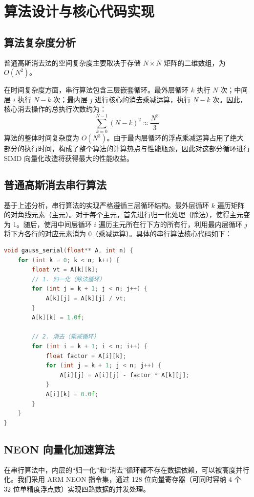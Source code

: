 \documentclass[a4paper]{article}
\begin{document}
\section{算法设计与核心代码实现}

\subsection{算法复杂度分析}
普通高斯消去法的空间复杂度主要取决于存储 $N \times N$ 矩阵的二维数组，为 $O(N^2)$。

在时间复杂度方面，串行算法包含三层嵌套循环。最外层循环 $k$ 执行 $N$ 次；中间层 $i$ 执行 $N-k$ 次；最内层 $j$ 进行核心的消去乘减运算，执行 $N-k$ 次。因此，核心消去操作的总执行次数约为：
\begin{equation}
\sum_{k=0}^{N-1} (N-k)^2 \approx \frac{N^3}{3}
\end{equation}
算法的整体时间复杂度为 $O(N^3)$。由于最内层循环的浮点乘减运算占用了绝大部分的执行时间，构成了整个算法的计算热点与性能瓶颈，因此对这部分循环进行 SIMD 向量化改造将获得最大的性能收益。

\subsection{普通高斯消去串行算法}
基于上述分析，串行算法的实现严格遵循三层循环结构。最外层循环 $k$ 遍历矩阵的对角线元素（主元）。对于每个主元，首先进行归一化处理（除法），使得主元变为 1。随后，使用中间层循环 $i$ 遍历主元所在行下方的所有行，利用最内层循环 $j$ 将下方各行的对应元素消为 0（乘减运算）。具体的串行算法核心代码如下：

\begin{lstlisting}[title=普通高斯消去串行算法,frame=trbl,language={C++}]
void gauss_serial(float** A, int n) {
    for (int k = 0; k < n; k++) {
        float vt = A[k][k];
        // 1. 归一化（除法循环）
        for (int j = k + 1; j < n; j++) { 
            A[k][j] = A[k][j] / vt; 
        }
        A[k][k] = 1.0f;
        
        // 2. 消去（乘减循环）
        for (int i = k + 1; i < n; i++) {
            float factor = A[i][k];
            for (int j = k + 1; j < n; j++) { 
                A[i][j] = A[i][j] - factor * A[k][j]; 
            }
            A[i][k] = 0.0f;
        }
    }
}
\end{lstlisting}

\subsection{NEON 向量化加速算法}
在串行算法中，内层的“归一化”和“消去”循环都不存在数据依赖，可以被高度并行化。我们采用 ARM NEON 指令集，通过 128 位向量寄存器（可同时容纳 4 个 32 位单精度浮点数）实现四路数据的并发处理。
\end{document}
